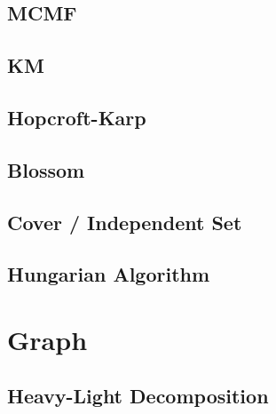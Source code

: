 \documentclass[a4paper,10pt,twocolumn,oneside,x11names]{article}
\begin{document}
%

\subsection{MCMF}


\subsection{KM}


\subsection{Hopcroft-Karp}


\subsection{Blossom}


% 

\subsection{Cover / Independent Set}


\subsection{Hungarian Algorithm}



\section{Graph}

\subsection{Heavy-Light Decomposition}

\end{document}
